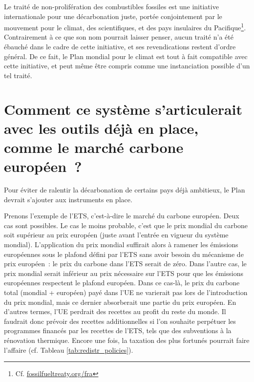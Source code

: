 \documentclass[a5paper,french,openany]{memoir}
\begin{document}
Le traité de non-prolifération des combustibles fossiles est une initiative internationale pour une décarbonation juste, portée conjointement par le mouvement pour le climat, des scientifiques, et des pays insulaires du Pacifique\footnote{Cf. \href{https://fossilfueltreaty.org/fra}{fossilfueltreaty.org/fra}}. Contrairement à ce que son nom pourrait laisser penser, aucun traité n'a été ébauché dans le cadre de cette initiative, et ses revendications restent d'ordre général. De ce fait, le Plan mondial pour le climat est tout à fait compatible avec cette initiative, et peut même être compris comme une instanciation possible d'un tel traité.

\section*{\normalsize Comment ce système s'articulerait avec les outils déjà en place, comme le marché carbone européen~?}\label{q:ets}

Pour éviter de ralentir la décarbonation de certains pays déjà ambitieux, le Plan devrait s'ajouter aux instruments en place. 

Prenons l'exemple de l'ETS, c'est-à-dire le marché du carbone européen. Deux cas sont possibles. Le cas le moins probable, c'est que le prix mondial du carbone soit supérieur au prix européen (juste avant l'entrée en vigueur du système mondial). L'application du prix mondial suffirait alors à ramener les émissions européennes sous le plafond défini par l'ETS sans avoir besoin du mécanisme de prix européen~: le prix du carbone dans l'ETS serait de zéro. Dans l'autre cas, le prix mondial serait inférieur au prix nécessaire sur l'ETS pour que les émissions européennes respectent le plafond européen. Dans ce cas-là, le prix du carbone total (mondial + européen) payé dans l'UE ne varierait pas lors de l'introduction du prix mondial, mais ce dernier absorberait une partie du prix européen. En d'autres termes, l'UE perdrait des recettes au profit du reste du monde. Il faudrait donc prévoir des recettes additionnelles si l'on souhaite perpétuer les programmes financés par les recettes de l'ETS, tels que des subventions à la rénovation thermique. Encore une fois, la taxation des plus fortunés pourrait faire l'affaire (cf. Tableau \ref{tab:redistr_policies}).


\end{document}
